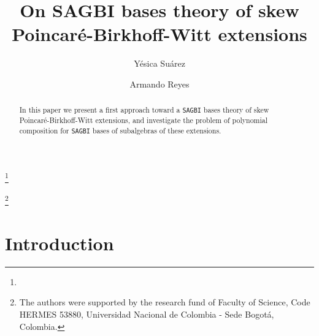 \documentclass{amsart}
\theoremstyle{definition}
\theoremstyle{remark}
\numberwithin{equation}{section}
\begin{document}
\title[On SAGBI bases theory of skew PBW extensions]{On SAGBI bases theory of skew Poincar\'e-Birkhoff-Witt extensions}

\author{Y\'esica Su\'arez}
\address{Universidad Nacional de Colombia - Sede Bogot\'a. Universidad Pedag\'ogica y Tecnol\'ogica de Colombia - Sede Tunja}
\thanks{}

\author{Armando Reyes}
\address{Universidad Nacional de Colombia - Sede Bogot\'a}

\thanks{The authors were supported by the research fund of Faculty of Science, Code HERMES 53880, Universidad Nacional de Colombia - Sede Bogot\'a, Colombia.}




\date{}



\begin{abstract}

In this paper we present a first approach toward a \texttt{SAGBI} bases theory of skew Poincar\'e-Birkhoff-Witt extensions, and investigate the problem of polynomial composition for \texttt{SAGBI} bases of subalgebras of these extensions. 
 

\end{abstract}

\maketitle


\section{Introduction}
\end{document}
